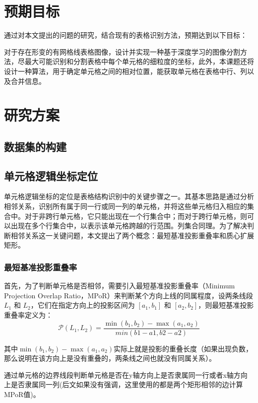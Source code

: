 \documentclass[UTF8,12pt, AutoFakeBold,fontset = founder]{ctexart}
\begin{document}
\section{预期目标}

通过对本文提出的问题的研究，结合现有的表格识别方法，预期达到以下目标：

对于存在形变的有网格线表格图像，设计并实现一种基于深度学习的图像分割方法，尽最大可能识别和分割表格中每个单元格的细粒度的坐标，此外，本课题还将设计一种算法，用于确定单元格之间的相对位置，能获取单元格在表格中行、列以及合并信息。



\section{研究方案}
\subsection{数据集的构建}
\subsection{单元格逻辑坐标定位}

单元格逻辑坐标的定位是表格结构识别中的关键步骤之一。其基本思路是通过分析相邻关系，识别所有属于同一行或同一列的单元格，并将这些单元格归入相应的集合中。对于非跨行单元格，它只能出现在一个行集合中；而对于跨行单元格，则可以出现在多个行集合中，以表示该单元格跨越的行范围。列集合同理。为了解决判断相邻关系这一关键问题，本文提出了两个概念：最短基准投影重叠率和质心扩展矩形。

\subsubsection{最短基准投影重叠率}
首先，为了判断单元格是否相邻，需要引入最短基准投影重叠率（Minimum Projection Overlap Ratio，MPoR）来判断某个方向上线的同属程度，设两条线段 \( L_1 \) 和 \( L_2 \)，它们在指定方向上的投影区间为 \([a_1, b_1]\) 和 \([a_2, b_2]\)，则最短基准投影重叠率定义为：
\begin{equation}
    \mathcal{P}(L_1,L_2) = \frac{\min(b_1, b_2) - \max(a_1, a_2)}{min(b1-a1, b2-a2)}
\label{eq:piol}
\end{equation}


其中$\min(b_1, b_2) - \max(a_1, a_2)$实际上就是投影的重叠长度（如果出现负数，那么说明在该方向上是没有重叠的，两条线之间也就没有同属关系）。

通过单元格的边界线段判断单元格是否在y轴方向上是否隶属同一行或者x轴方向上是否隶属同一列(后文如果没有强调，这里使用的都是两个矩形相邻的边计算MPoR值)。
\end{document}
